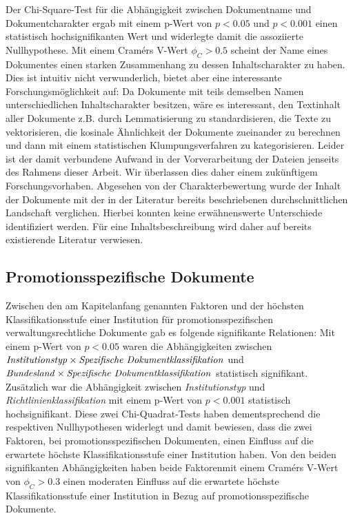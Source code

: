 Der Chi-Square-Test für die Abhängigkeit zwischen Dokumentname und Dokumentcharakter ergab mit einem p-Wert von $p<\num{0.05}$ und $p<\num{0.001}$ einen statistisch hochsignifikanten Wert und widerlegte damit die assoziierte Nullhypothese.
Mit einem Cramérs V-Wert $\phi_C>\num{0,5}$ scheint der Name eines Dokumentes einen starken Zusammenhang zu dessen Inhaltscharakter zu haben.
Dies ist intuitiv nicht verwunderlich, bietet aber eine interessante Forschungsmöglichkeit auf:
Da Dokumente mit teils demselben Namen unterschiedlichen Inhaltscharakter besitzen, wäre es interessant, den Textinhalt aller Dokumente z.B. durch Lemmatisierung zu standardisieren, die Texte zu vektorisieren, die kosinale Ähnlichkeit der Dokumente zueinander zu berechnen und dann mit einem statistischen Klumpungsverfahren zu kategorisieren.
Leider ist der damit verbundene Aufwand in der Vorverarbeitung der Dateien jenseits des Rahmens dieser Arbeit.
Wir überlassen dies daher einem zukünftigem Forschungsvorhaben.
Abgesehen von der Charakterbewertung wurde der Inhalt der Dokumente mit der in der Literatur bereits beschriebenen durchschnittlichen Landschaft verglichen.
Hierbei konnten keine erwähnenswerte Unterschiede identifiziert werden.
Für eine Inhaltsbeschreibung wird daher auf bereits existierende Literatur verwiesen.~\autocite{Hiemenz2018-fdm-title,Hiemenz2018-fdm-report}

\subsection{Promotionsspezifische Dokumente}\label{sec:policy-discussion-specific}
Zwischen den am Kapitelanfang genannten Faktoren und der höchsten Klassifikationsstufe einer Institution für promotionsspezifischen verwaltungsrechtliche Dokumente gab es folgende signifikante Relationen:
Mit einem p-Wert von $p<\num{0,05}$ waren die Abhängigkeiten zwischen $\text{\textit{Institutionstyp}}\times\text{\textit{Spezifische Dokumentklassifikation}}$ und $\text{\textit{Bundesland}}\times\text{\textit{Spezifische Dokumentklassifikation}}$ statistisch signifikant.
Zusätzlich war die Abhängigkeit zwischen \textit{Institutionstyp} und \textit{Richtlinienklassifikation} mit einem p-Wert von $p<\num{0,001}$ statistisch hochsignifikant.
Diese zwei Chi-Quadrat-Tests haben dementsprechend die respektiven Nullhypothesen widerlegt und damit bewiesen, dass die zwei Faktoren, bei promotionsspezifischen Dokumenten, einen Einfluss auf die erwartete höchste Klassifikationsstufe einer Institution haben.
Von den beiden signifikanten Abhängigkeiten haben beide Faktorenmit einem Cramérs V-Wert von $\phi_C>\num{0.3}$ einen moderaten Einfluss auf die erwartete höchste Klassifikationsstufe einer Institution in Bezug auf promotionsspezifische Dokumente.

